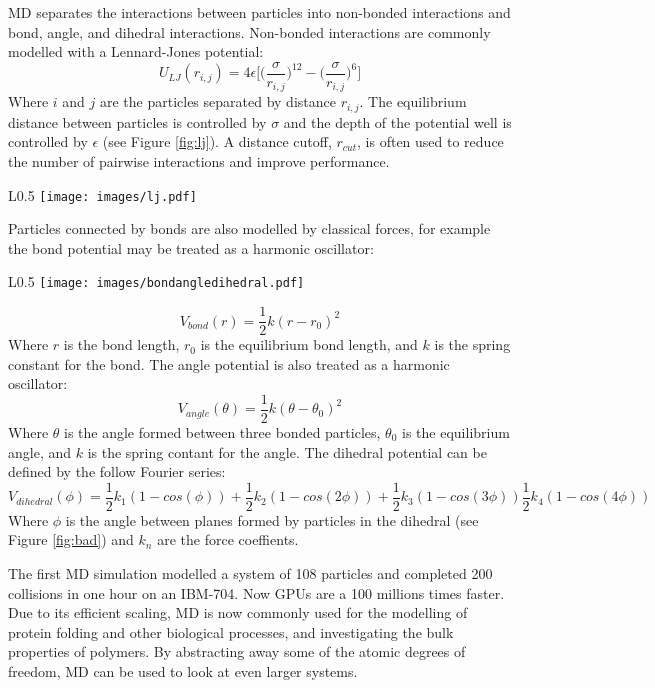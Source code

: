 MD separates the interactions between particles into non-bonded interactions and bond, angle, and dihedral interactions.
Non-bonded interactions are commonly modelled with a Lennard-Jones potential:
$$ U_{LJ}(r_{i,j}) = 4\epsilon\big[\big(\frac{\sigma}{r_{i,j}}\big)^{12}-\big(\frac{\sigma}{r_{i,j}}\big)^{6}\big]$$
Where $i$ and $j$ are the particles separated by distance $r_{i,j}$.
The equilibrium distance between particles is controlled by $\sigma$ and the depth of the potential well is controlled by $\epsilon$ (see Figure \ref{fig:lj}).
A distance cutoff, $r_{cut}$, is often used to reduce the number of pairwise interactions and improve performance.

\begin{wrapfigure}{L}{0.5\linewidth}
    \centering
    \texttt{[image: images/lj.pdf]}
    \caption{The Lennard-Jones potential with relevant distances labelled}
    \label{fig:lj}
\end{wrapfigure}

Particles connected by bonds are also modelled by classical forces, for example the bond potential may be treated as a harmonic oscillator:

\begin{wrapfigure}{L}{0.5\linewidth}
    \centering
    \texttt{[image: images/bondangledihedral.pdf]}
    \caption{Bonded interactions: bond (top left), angle (top right), and dihedral (bottom). Image adapted from \cite{punma}.}
    \label{fig:bad}
\end{wrapfigure}

$$V_{bond}(r) = \frac{1}{2}k(r-r_{0})^{2}$$
Where $r$ is the bond length, $r_{0}$ is the equilibrium bond length, and $k$ is the spring constant for the bond.
The angle potential is also treated as a harmonic oscillator:
$$V_{angle}(\theta)=\frac{1}{2}k(\theta-\theta_{0})^{2}$$
Where $\theta$ is the angle formed between three bonded particles, $\theta_{0}$ is the equilibrium angle, and $k$ is the spring contant for the angle.
The dihedral potential can be defined by the follow Fourier series:
$$V_{dihedral}(\phi)=\frac{1}{2}k_{1}(1-cos(\phi))+\frac{1}{2}k_{2}(1-cos(2\phi))+\frac{1}{2}k_{3}(1-cos(3\phi))\frac{1}{2}k_{4}(1-cos(4\phi))$$
Where $\phi$ is the angle between planes formed by particles in the dihedral (see Figure \ref{fig:bad}) and $k_{n}$ are the force coeffients.

The first MD simulation modelled a system of 108 particles and completed 200 collisions in one hour on an IBM-704\cite{Alder1957}.
Now GPUs are a 100 millions times faster.
Due to its efficient scaling, MD is now commonly used for the modelling of protein folding \cite{levitt75} and other biological processes, and investigating the bulk properties of polymers\cite{Gartner2019a}.
By abstracting away some of the atomic degrees of freedom, MD can be used to look at even larger systems. %

